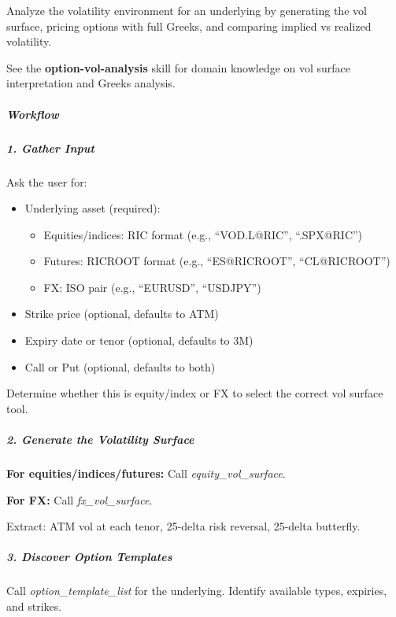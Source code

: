 \documentclass[11pt]{article}
\begin{document}
Analyze the volatility environment for an underlying by generating the vol surface, pricing options with full Greeks, and comparing implied vs realized volatility.


See the \textbf{option-vol-analysis} skill for domain knowledge on vol surface interpretation and Greeks analysis.


\subparagraph{Workflow}\mbox{}\par

\subparagraph{1. Gather Input}\mbox{}\par

Ask the user for:

\begin{itemize}[leftmargin=*,itemsep=2pt,topsep=2pt]
\item {} Underlying asset (required):
\begin{itemize}[leftmargin=*,itemsep=2pt,topsep=2pt]
\item {} Equities/indices: RIC format (e.g., ``VOD.L@RIC'', ``.SPX@RIC'')
\item {} Futures: RICROOT format (e.g., ``ES@RICROOT'', ``CL@RICROOT'')
\item {} FX: ISO pair (e.g., ``EURUSD'', ``USDJPY'')
\end{itemize}
\item {} Strike price (optional, defaults to ATM)
\item {} Expiry date or tenor (optional, defaults to 3M)
\item {} Call or Put (optional, defaults to both)
\end{itemize}

Determine whether this is equity/index or FX to select the correct vol surface tool.


\subparagraph{2. Generate the Volatility Surface}\mbox{}\par

\textbf{For equities/indices/futures:} Call \emph{equity\_\allowbreak{}vol\_\allowbreak{}surface}.


\textbf{For FX:} Call \emph{fx\_\allowbreak{}vol\_\allowbreak{}surface}.


Extract: ATM vol at each tenor, 25-delta risk reversal, 25-delta butterfly.


\subparagraph{3. Discover Option Templates}\mbox{}\par

Call \emph{option\_\allowbreak{}template\_\allowbreak{}list} for the underlying. Identify available types, expiries, and strikes.
\end{document}
